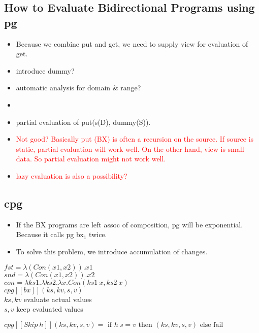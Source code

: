 \documentclass[runningheads]{llncs}
\newcommand{\tab}{\hspace*{5mm}}
\newcommand{\cpg}[5]{cpg [\![#1]\!] (#2, #3, #4, #5)}
\begin{document}
\subsection{How to Evaluate Bidirectional Programs using pg}

\begin{itemize}
\item Because we combine put and get, we need to supply view for evaluation of get.
\item introduce dummy?
\item automatic analysis for domain \& range?
\item 
\item partial evaluation of put(s(D), dummy(S)).
\item \textcolor{red}{Not good? Basically put (BX) is often a recursion on the source. If source is static, partial evaluation will work well. On the other hand, view is small data. So partial evaluation might not work well.}
\item \textcolor{red}{lazy evaluation is also a possibility?}
\end{itemize}

\subsection{cpg}

\begin{itemize}
\item If the BX programs are left assoc of composition, pg will be exponential. Because it calls pg bx$_1$ twice.
\item To solve this problem, we introduce accumulation of changes.
\end{itemize}

$fst = \lambda (Con (x1, x2)). x1$\\
$snd = \lambda (Con (x1, x2)). x2$\\
$con = \lambda ks1. \lambda ks2. \lambda x. Con(ks1 \ x, ks2 \ x)$\\

$\cpg{bx}{ks}{kv}{s}{v}$ \\
    \tab $ks, kv$ evaluate actual values\\
    \tab $s, v$ keep evaluated values\\
\vspace{3mm}

$\cpg{Skip \ h}{ks}{kv}{s}{v} = \text{ if } h \ s = v \text{ then } (ks, kv, s, v) \text{ else fail}$\\
\end{document}
